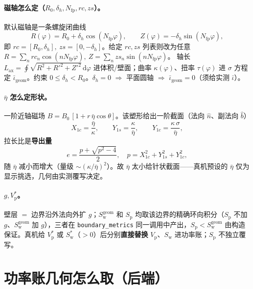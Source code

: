 \documentclass[UTF8,11pt]{ctexart}
\newcommand{\Vp}{V_\mathrm{p}}
\newcommand{\Sw}{S_\mathrm{w}}
\newcommand{\Sp}{S_\mathrm{p}}
\newcommand{\Lax}{L_\mathrm{ax}}
\newcommand{\iotabar}{\bar{\iota}}
\begin{document}
\paragraph{磁轴怎么定（$R_0,\delta_h,N_\mathrm{fp},rc,zs$）。}
默认磁轴是一条螺旋闭曲线
\begin{equation}
R(\varphi)=R_0+\delta_h\cos(N_\mathrm{fp}\varphi),\qquad
Z(\varphi)=-\delta_h\sin(N_\mathrm{fp}\varphi),
\end{equation}
即 $rc=[R_0,\delta_h],\ zs=[0,-\delta_h]$。给定 $rc,zs$ 列表则改为任意
$R=\sum_n rc_n\cos(nN_\mathrm{fp}\varphi),\ Z=\sum_n zs_n\sin(nN_\mathrm{fp}\varphi)$。
轴长 $\Lax=\oint\!\sqrt{R^2+R'^2+Z'^2}\,\mathrm d\varphi$ 进体积/壁面；曲率 $\kappa(\varphi)$、扭率 $\tau(\varphi)$ 进 $\sigma$ 方程定 $\iotabar_\mathrm{geom}$。约束 $0\le\delta_h<R_0$。$\delta_h=0$ $\Rightarrow$ 平面圆轴 $\Rightarrow$ $\iotabar_\mathrm{geom}=0$（须给实测 $\iotabar$）。

\paragraph{$\bar\eta$ 怎么定形状。}
一阶近轴磁场 $B=B_0\,[1+r\,\bar\eta\cos\theta]$。该塑形给出一阶截面（法向 $\hat n$、副法向 $\hat b$）
\begin{equation}
X_{1c}=\frac{\bar\eta}{\kappa},\qquad
Y_{1s}=\frac{\kappa}{\bar\eta},\qquad
Y_{1c}=\frac{\kappa\,\sigma}{\bar\eta},
\end{equation}
拉长比是\textbf{导出量}
\begin{equation}
e=\frac{p+\sqrt{p^2-4}}{2},\quad p=X_{1c}^2+Y_{1s}^2+Y_{1c}^2,
\end{equation}
随 $\bar\eta$ 减小而增大（量级 $\sim(\kappa/\bar\eta)^2$）。故 $\bar\eta$ 太小给针状截面——真机预设的 $\bar\eta$ 仅为显示挑选，几何由实测覆写决定。

\paragraph{$g,\Vp^{*}$。}
壁层 $=$ 边界沿外法向外扩 $g$；$\Sw^{\mathrm{geom}}$ 和 $\Sp$ 均取该边界的精确环向积分（$\Sp$ 不加 $g$、$\Sw^{\mathrm{geom}}$ 加 $g$），三者在 \texttt{boundary\_metrics} 同一调用中产出，$\Sp<\Sw^{\mathrm{geom}}$ 由构造保证。真机给 $\Vp^{*}$ 或 $\Sw^{*}$（$>0$）后分别\textbf{直接替换} $\Vp$、$\Sw$ 进功率账；$\Sp$ 不独立覆写。

\section{功率账几何怎么取（后端）}\label{sec:backend}
\end{document}
